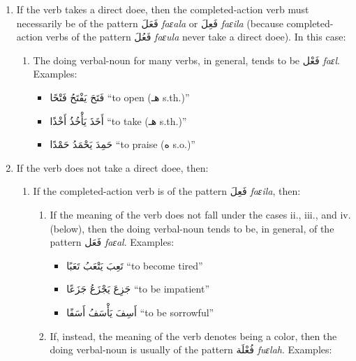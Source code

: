 \documentclass[
  10pt,
]{book}
\providecommand{\tightlist}{%
  \setlength{\itemsep}{0pt}\setlength{\parskip}{0pt}}
\begin{document}
\begin{enumerate}
\def\labelenumi{\arabic{enumi}.}
\tightlist
\item
  If the verb takes a direct doee, then the completed-action verb must necessarily be of the pattern \foreignlanguage{arabic}{فَعَلَ} \emph{faɛala} or \foreignlanguage{arabic}{فَعِلَ} \emph{faɛila} (because completed-action verbs of the pattern \foreignlanguage{arabic}{فَعُلَ} \emph{faɛula} never take a direct doee). In this case:

  \begin{enumerate}
  \def\labelenumii{\alph{enumii}.}
  \tightlist
  \item
    The doing verbal-noun for many verbs, in general, tends to be \foreignlanguage{arabic}{فَعْل} \emph{faɛl}. Examples:

    \begin{itemize}
    \tightlist
    \item
      \foreignlanguage{arabic}{فَتَحَ يَفْتَحُ فَتْحًا} \enquote{to open (\foreignlanguage{arabic}{هـ} s.th.)}
    \item
      \foreignlanguage{arabic}{أَخَذَ يَأْخُذُ أَخْذًا} \enquote{to take (\foreignlanguage{arabic}{هـ} s.th.)}
    \item
      \foreignlanguage{arabic}{حَمِدَ يَحْمَدُ حَمْدًا} \enquote{to praise (\foreignlanguage{arabic}{ه} s.o.)}
    \end{itemize}
  \end{enumerate}
\item
  If the verb does not take a direct doee, then:

  \begin{enumerate}
  \def\labelenumii{\alph{enumii}.}
  \tightlist
  \item
    If the completed-action verb is of the pattern \foreignlanguage{arabic}{فَعِلَ} \emph{faɛila}, then:

    \begin{enumerate}
    \def\labelenumiii{\roman{enumiii}.}
    \tightlist
    \item
      If the meaning of the verb does not fall under the cases ii., iii., and iv. (below), then the doing verbal-noun tends to be, in general, of the pattern \foreignlanguage{arabic}{فَعَل} \emph{faɛal}. Examples:

      \begin{itemize}
      \tightlist
      \item
        \foreignlanguage{arabic}{تَعِبَ يَتْعَبُ تَعَبًا} \enquote{to become tired}
      \item
        \foreignlanguage{arabic}{جَزِعَ يَجْزَعُ جَزَعًا} \enquote{to be impatient}
      \item
        \foreignlanguage{arabic}{أَسِفَ يَأْسَفُ أَسَفًا} \enquote{to be sorrowful}
      \end{itemize}
    \item
      If, instead, the meaning of the verb denotes being a color, then the doing verbal-noun is usually of the pattern \foreignlanguage{arabic}{فُعْلَة} \emph{fuɛlah}. Examples:


\end{enumerate}
\end{enumerate}
\end{enumerate}
\end{document}
